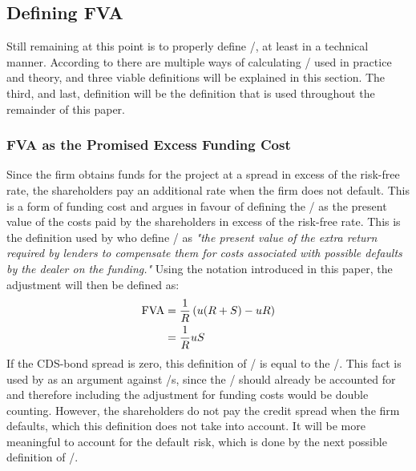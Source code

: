 \documentclass[main.tex]{subfiles}
\begin{document}
    \subsection{Defining FVA}
    \label{sec:defining-fva}
        Still remaining at this point is to properly define \FVA/, at least in a technical manner.
        According to \textcite{ADS2019} there are multiple ways of calculating \FVA/ used in practice and theory,
        and three viable definitions will be explained in this section.
        The third, and last, definition will be the definition that is used throughout
        the remainder of this paper.

        \subsubsection*{FVA as the Promised Excess Funding Cost}
            Since the firm obtains funds for the project at a spread in excess of the risk-free rate, 
            the shareholders pay an additional rate when the firm does not default. 
            This is a form of funding cost and argues in favour of defining the \FVA/ as
            the present value of the costs paid by the shareholders in excess of the risk-free rate.
            This is the definition used by \textcite{HullWhiteFVA} who define \FVA/ as 
            \textit{
                "the present value of the extra return required by lenders to compensate them 
                for costs associated with possible defaults by the dealer on the funding."
            }
            Using the notation introduced in this paper, the adjustment will then be defined as:
                \begin{align}
                    \FVA/ 
                    &= 
                        \discountfactor \left(
                            u (\grossrfrate + S)
                            - u \grossrfrate
                        \right) 
                        \nonumber \\
                    &= 
                        \discountfactor u S
                    \label{eqn:fva-as-promised-excess-funding-cost}
                \end{align}
            If the CDS-bond spread is zero, this definition of \FVA/ is equal to the \DVA/.
            This fact is used by \textcite{HullWhiteFVA} as an argument against \FVA/s,
            since the \DVA/ should already be accounted for and therefore including the adjustment
            for funding costs would be double counting.
            However, the shareholders do not pay the credit spread when the firm defaults,
            which this definition does not take into account.
            It will be more meaningful to account for the default risk, 
            which is done by the next possible definition of \FVA/.
\end{document}
